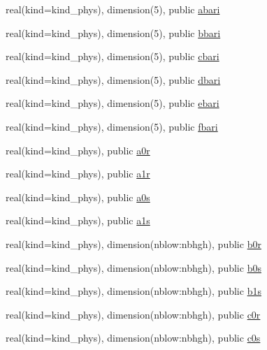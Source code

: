 \begin{DoxyCompactItemize}
real(kind=kind\+\_\+phys), dimension(5), public \hyperlink{group__module__radsw__main_gace960bbbf15ab3cadbee76301ff111dd}{abari}
\item 
real(kind=kind\+\_\+phys), dimension(5), public \hyperlink{group__module__radsw__main_gad5342321ccd4759cb70f7a673620ee19}{bbari}
\item 
real(kind=kind\+\_\+phys), dimension(5), public \hyperlink{group__module__radsw__main_gae7f1de5c9736894ac7b54c0e0d312f16}{cbari}
\item 
real(kind=kind\+\_\+phys), dimension(5), public \hyperlink{group__module__radsw__main_gaf8b02590603ea2f838d954cb0a93bbeb}{dbari}
\item 
real(kind=kind\+\_\+phys), dimension(5), public \hyperlink{group__module__radsw__main_ga3cc7ab844ca564bd3df02a687bbc2f43}{ebari}
\item 
real(kind=kind\+\_\+phys), dimension(5), public \hyperlink{group__module__radsw__main_gac2e5b61aea6effe7d49586bf5223c154}{fbari}
\item 
real(kind=kind\+\_\+phys), public \hyperlink{group__module__radsw__main_ga0fdb9425031a10735e11d7f5c9e0376e}{a0r}
\item 
real(kind=kind\+\_\+phys), public \hyperlink{group__module__radsw__main_ga9826a0616c434620200ce4652b5af800}{a1r}
\item 
real(kind=kind\+\_\+phys), public \hyperlink{group__module__radsw__main_ga81ba576e28e5844772d040ff7543faae}{a0s}
\item 
real(kind=kind\+\_\+phys), public \hyperlink{group__module__radsw__main_ga9bf8de06b96c5014ca7f21fd39d84257}{a1s}
\item 
real(kind=kind\+\_\+phys), dimension(nblow\+:nbhgh), public \hyperlink{group__module__radsw__main_gac39d49e73ffa960421e36e45a35db162}{b0r}
\item 
real(kind=kind\+\_\+phys), dimension(nblow\+:nbhgh), public \hyperlink{group__module__radsw__main_ga391fbdda62f6fba95e105c2041e16880}{b0s}
\item 
real(kind=kind\+\_\+phys), dimension(nblow\+:nbhgh), public \hyperlink{group__module__radsw__main_ga2d2296e76fb85b66bd4583bcb9fa271b}{b1s}
\item 
real(kind=kind\+\_\+phys), dimension(nblow\+:nbhgh), public \hyperlink{group__module__radsw__main_ga8927b6e7cc810301e3843eb0f5c0c795}{c0r}
\item 
real(kind=kind\+\_\+phys), dimension(nblow\+:nbhgh), public \hyperlink{group__module__radsw__main_gaab7693c5f31ce2182bca61aff77996bc}{c0s}
\end{DoxyCompactItemize}


